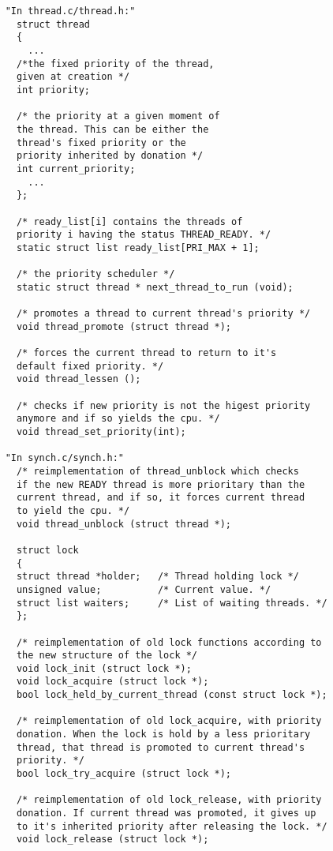     \begin{lstlisting}
    "In thread.c/thread.h:"
      struct thread
      {
	    ...
	  /*the fixed priority of the thread,
	  given at creation */
	  int priority;
	  
	  /* the priority at a given moment of
	  the thread. This can be either the
	  thread's fixed priority or the 
	  priority inherited by donation */
	  int current_priority;		
	    ...
      };
      
      /* ready_list[i] contains the threads of
      priority i having the status THREAD_READY. */
      static struct list ready_list[PRI_MAX + 1];

      /* the priority scheduler */
      static struct thread * next_thread_to_run (void);

      /* promotes a thread to current thread's priority */
      void thread_promote (struct thread *);
      
      /* forces the current thread to return to it's
      default fixed priority. */
      void thread_lessen ();

      /* checks if new priority is not the higest priority 
      anymore and if so yields the cpu. */
      void thread_set_priority(int);

    "In synch.c/synch.h:"
      /* reimplementation of thread_unblock which checks 
      if the new READY thread is more prioritary than the 
      current thread, and if so, it forces current thread 
      to yield the cpu. */
      void thread_unblock (struct thread *);

      struct lock 
      {
	  struct thread *holder;   /* Thread holding lock */
	  unsigned value;          /* Current value. */
	  struct list waiters;     /* List of waiting threads. */
      };

      /* reimplementation of old lock functions according to
      the new structure of the lock */
      void lock_init (struct lock *);
      void lock_acquire (struct lock *);
      bool lock_held_by_current_thread (const struct lock *);

      /* reimplementation of old lock_acquire, with priority
      donation. When the lock is hold by a less prioritary
      thread, that thread is promoted to current thread's
      priority. */
      bool lock_try_acquire (struct lock *);

      /* reimplementation of old lock_release, with priority
      donation. If current thread was promoted, it gives up
      to it's inherited priority after releasing the lock. */
      void lock_release (struct lock *);      

    \end{lstlisting}


